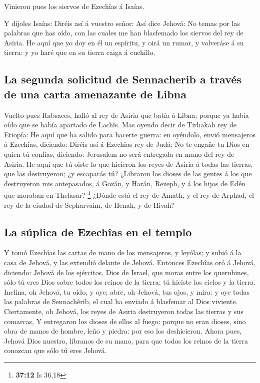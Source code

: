  Vinieron pues los siervos de Ezechîas á Isaías.

 Y díjoles Isaías: Diréis así á vuestro señor: Así dice
Jehová: No temas por las palabras que has oído, con las cuales me han
blasfemado los siervos del rey de Asiria.  He aquí que yo
doy en él un espíritu, y oirá un rumor, y volveráse á su tierra: y yo
haré que en su tierra caiga á cuchillo.

\hypertarget{la-segunda-solicitud-de-sennacherib-a-travuxe9s-de-una-carta-amenazante-de-libna}{%
\subsection{La segunda solicitud de Sennacherib a través de una carta
amenazante de
Libna}\label{la-segunda-solicitud-de-sennacherib-a-travuxe9s-de-una-carta-amenazante-de-libna}}

 Vuelto pues Rabsaces, halló al rey de Asiria que batía á
Libna; porque ya había oído que se había apartado de Lachîs.
 Mas oyendo decir de Tirhakah rey de Etiopía: He aquí que ha
salido para hacerte guerra: en oyéndolo, envió mensajeros á Ezechîas,
diciendo:  Diréis así á Ezechîas rey de Judá: No te engañe
tu Dios en quien tú confías, diciendo: Jerusalem no será entregada en
mano del rey de Asiria.  He aquí que tú oiste lo que
hicieron los reyes de Asiria á todas las tierras, que las destruyeron;
¿y escaparás tú?  ¿Libraron los dioses de las gentes á los
que destruyeron mis antepasados, á Gozán, y Harán, Rezeph, y á los hijos
de Edén que moraban en Thelasar? \footnote{\textbf{37:12} Is 36,18}
 ¿Dónde está el rey de Amath, y el rey de Arphad, el rey de
la ciudad de Sepharvaim, de Henah, y de Hivah?

\hypertarget{la-suxfaplica-de-ezechuxeeas-en-el-templo}{%
\subsection{La súplica de Ezechîas en el
templo}\label{la-suxfaplica-de-ezechuxeeas-en-el-templo}}

 Y tomó Ezechîas las cartas de mano de los mensajeros, y
leyólas; y subió á la casa de Jehová, y las extendió delante de Jehová.
 Entonces Ezechîas oró á Jehová, diciendo: 
Jehová de los ejércitos, Dios de Israel, que moras entre los querubines,
sólo tú eres Dios sobre todos los reinos de la tierra; tú hiciste los
cielos y la tierra.  Inclina, oh Jehová, tu oído, y oye;
abre, oh Jehová, tus ojos, y mira: y oye todas las palabras de
Sennachêrib, el cual ha enviado á blasfemar al Dios viviente.
 Ciertamente, oh Jehová, los reyes de Asiria destruyeron
todas las tierras y sus comarcas,  Y entregaron los dioses
de ellos al fuego: porque no eran dioses, sino obra de manos de hombre,
leño y piedra: por eso los deshicieron.  Ahora pues, Jehová
Dios nuestro, líbranos de su mano, para que todos los reinos de la
tierra conozcan que sólo tú eres Jehová.

